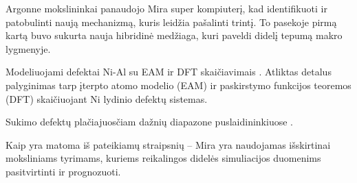 Argonne mokslininkai panaudojo Mira super kompiuterį, kad identifikuoti ir patobulinti naują mechanizmą, kuris leidžia pašalinti trintį. To pasekoje pirmą kartą buvo sukurta nauja hibridinė medžiaga, kuri paveldi didelį tepumą makro lygmenyje.

 
Modeliuojami defektai Ni-Al su EAM ir DFT skaičiavimais \cite{0965-0393-24-4-045012}. Atliktas detalus palyginimas tarp įterpto atomo modelio (EAM) ir paskirstymo funkcijos teoremos (DFT) skaičiuojant Ni lydinio defektų sistemas.

Sukimo defektų plačiajuosčiam dažnių diapazone puslaidininkiuose \cite{Seo2016}.

Kaip yra matoma iš pateikiamų straipsnių -- Mira yra naudojamas išskirtinai moksliniams tyrimams, kuriems reikalingos didelės simuliacijos duomenims pasitvirtinti ir prognozuoti.

